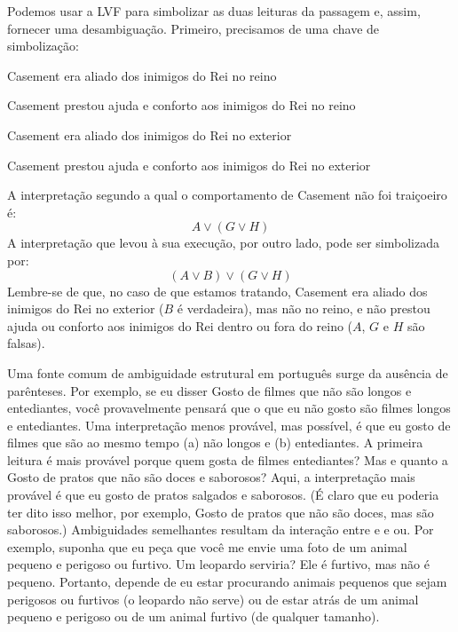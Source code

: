 Podemos usar a LVF para simbolizar as duas leituras da passagem e,
assim, fornecer uma desambiguação. Primeiro, precisamos de uma chave de
simbolização:
\begin{ekey}
	\item[A] Casement era aliado dos inimigos do Rei no reino
	\item[G] Casement prestou ajuda e conforto aos inimigos do Rei no reino
	\item[B] Casement era aliado dos inimigos do Rei no exterior
	\item[H] Casement prestou ajuda e conforto aos inimigos do Rei no exterior
\end{ekey}
A interpretação segundo a qual o comportamento de Casement não foi
traiçoeiro é:
\[A \lor (G \lor H)\]
A interpretação que levou à sua execução, por outro lado, pode ser
simbolizada por:
\[(A \lor B) \lor (G \lor H)\]
Lembre-se de que, no caso de que estamos tratando, Casement era aliado
dos inimigos do Rei no exterior ($B$ é verdadeira), mas não no reino, e
não prestou ajuda ou conforto aos inimigos do Rei dentro ou fora do reino
($A$, $G$ e $H$ são falsas).

Uma fonte comum de ambiguidade estrutural em português surge da ausência
de parênteses. Por exemplo, se eu disser Gosto de filmes que não
são longos e entediantes, você provavelmente pensará que o que eu não
gosto são filmes longos e entediantes. Uma interpretação menos provável,
mas possível, é que eu gosto de filmes que são ao mesmo tempo (a) não
longos e (b) entediantes. A primeira leitura é mais provável porque quem
gosta de filmes entediantes? Mas e quanto a Gosto de pratos que não
são doces e saborosos? Aqui, a interpretação mais provável é que eu gosto
de pratos salgados e saborosos. (É claro que eu poderia ter dito isso
melhor, por exemplo, Gosto de pratos que não são doces, mas são
saborosos.) Ambiguidades semelhantes resultam da interação entre
e e ou. Por exemplo, suponha que eu peça que você me envie
uma foto de um animal pequeno e perigoso ou furtivo. Um leopardo serviria?
Ele é furtivo, mas não é pequeno. Portanto, depende de eu estar procurando
animais pequenos que sejam perigosos ou furtivos (o leopardo não serve) ou
de estar atrás de um animal pequeno e perigoso ou de um animal furtivo (de
qualquer tamanho).

